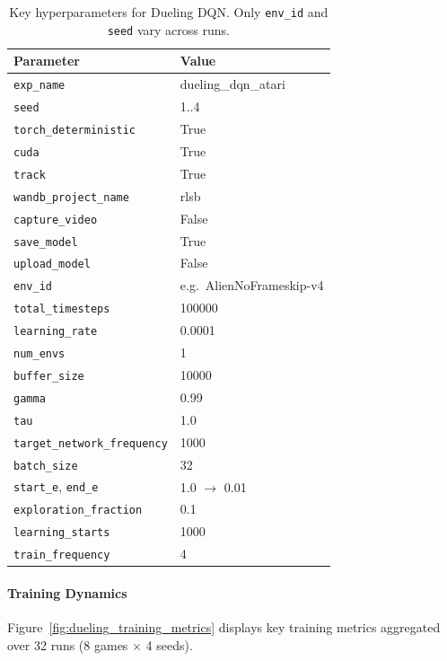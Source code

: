 \begin{table}
	\caption{Key hyperparameters for Dueling DQN. Only \texttt{env\_id} and \texttt{seed} vary across runs.}
	\label{tab:dueling_dqn_hyperparams}
	\centering
	\begin{tabular}{ll}
		\toprule
		\textbf{Parameter} & \textbf{Value} \\
		\midrule
		\texttt{exp\_name}                & dueling\_dqn\_atari \\
		\texttt{seed}                     & 1..4 \\
		\texttt{torch\_deterministic}     & True \\
		\texttt{cuda}                     & True \\
		\texttt{track}                    & True \\
		\texttt{wandb\_project\_name}     & rlsb \\
		\texttt{capture\_video}           & False \\
		\texttt{save\_model}              & True \\
		\texttt{upload\_model}            & False \\
		\texttt{env\_id}                  & e.g.\ AlienNoFrameskip-v4 \\
		\texttt{total\_timesteps}         & 100000 \\
		\texttt{learning\_rate}           & 0.0001 \\
		\texttt{num\_envs}                & 1 \\
		\texttt{buffer\_size}             & 10000 \\
		\texttt{gamma}                    & 0.99 \\
		\texttt{tau}                      & 1.0 \\
		\texttt{target\_network\_frequency} & 1000 \\
		\texttt{batch\_size}             & 32 \\
		\texttt{start\_e}, \texttt{end\_e} & 1.0 $\to$ 0.01 \\
		\texttt{exploration\_fraction}    & 0.1 \\
		\texttt{learning\_starts}         & 1000 \\
		\texttt{train\_frequency}         & 4 \\
		\bottomrule
	\end{tabular}
\end{table}

\paragraph{Training Dynamics}
Figure~\ref{fig:dueling_training_metrics} displays key training metrics aggregated over 32 runs (8 games $\times$ 4 seeds). 

